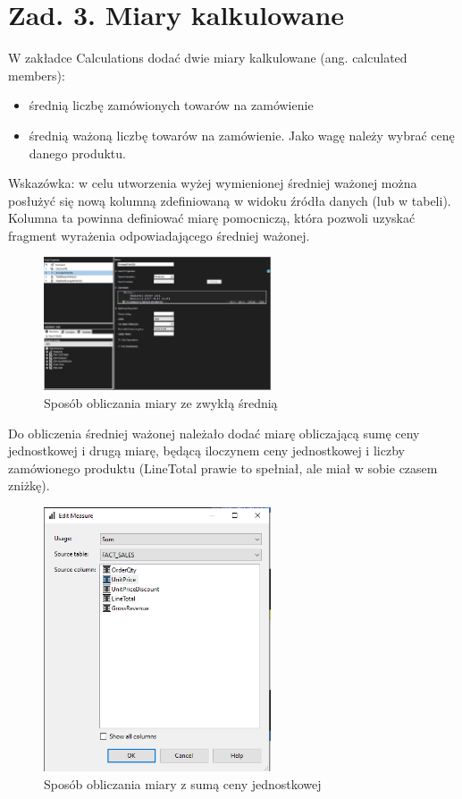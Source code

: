 \documentclass[a4paper,12pt]{article}
\begin{document}
\section{Zad. 3. Miary kalkulowane}

W zakładce Calculations dodać dwie miary kalkulowane (ang. calculated members):\begin{itemize}
  \item średnią liczbę zamówionych towarów na zamówienie
  \item średnią ważoną liczbę towarów na zamówienie. Jako wagę należy wybrać cenę danego produktu.
\end{itemize}
Wskazówka: w celu utworzenia wyżej wymienionej średniej ważonej można posłużyć się nową
kolumną zdefiniowaną w widoku źródła danych (lub w tabeli). Kolumna ta powinna definiować
miarę pomocniczą, która pozwoli uzyskać fragment wyrażenia odpowiadającego średniej
ważonej.

\begin{figure}[H]
  \centering
  \includegraphics[width=0.6\textwidth]{3_calculations_1.png}
  \caption{Sposób obliczania miary ze zwykłą średnią}
\end{figure}

Do obliczenia średniej ważonej należało dodać miarę obliczającą sumę ceny jednostkowej i drugą miarę, będącą iloczynem ceny jednostkowej i liczby zamówionego produktu (LineTotal prawie to spełniał, ale miał w sobie czasem zniżkę).

\begin{figure}[H]
  \centering
  \includegraphics[width=0.6\textwidth]{3_sum_unit_price.png}
  \caption{Sposób obliczania miary z sumą ceny jednostkowej}
\end{figure}
\end{document}
